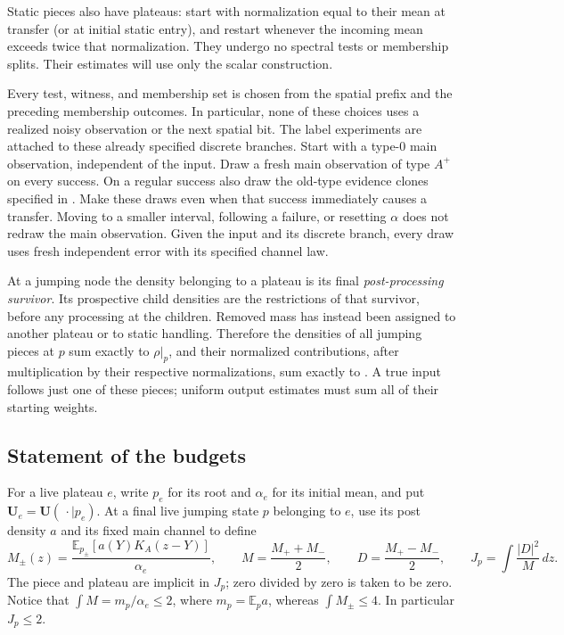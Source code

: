 Static pieces also have plateaus: start with normalization equal to
their mean at transfer (or at initial static entry), and restart
whenever the incoming mean exceeds twice that normalization.  They
undergo no spectral tests or membership splits.  Their estimates will
use only the scalar construction.

Every test, witness, and membership set is chosen from the spatial
prefix and the preceding membership outcomes.  In particular, none of
these choices uses a realized noisy observation or the next spatial
bit.  The label experiments are attached to these already specified
discrete branches.  Start with a type-$0$ main observation, independent
of the input.  Draw a fresh main observation of type $A^+$ on every
success.  On a regular success also draw the old-type evidence clones
specified in .  Make these draws even when
that success immediately causes a transfer.  Moving to a smaller
interval, following a failure, or resetting $\alpha$ does not redraw
the main observation.  Given the input and its discrete branch, every
draw uses fresh independent error with its specified channel law.

At a jumping node the density belonging to a plateau is its final
\emph{post-processing survivor}.  Its prospective child densities
are the restrictions of that survivor, before any processing at the
children.  Removed mass has instead been assigned to another plateau
or to static handling.  Therefore the densities of all jumping pieces
at $p$ sum exactly to $\rho|_p$, and their normalized contributions, after
multiplication by their respective normalizations, sum exactly to
.  A true input follows just one of these pieces;
uniform output estimates must sum all of their starting weights.

\subsection{Statement of the budgets}

For a live plateau $e$, write $p_e$ for its root and $\alpha_e$ for its
initial mean, and put $\mathbf U_e=\mathbf U(\,\cdot\mid p_e)$.
At a final live jumping state $p$ belonging to $e$, use its post
density $a$ and its fixed main channel to define
\[
 M_\pm(z)=\frac{\mathbb E_{p_\pm}[a(Y)K_A(z-Y)]}{\alpha_e},\qquad
 M=\frac{M_++M_-}{2},\qquad
 D=\frac{M_+-M_-}{2},\qquad
 J_p=\int\frac{|D|^2}{M}\,dz.
\]
The piece and plateau are implicit in $J_p$; zero divided by zero is
taken to be zero.  Notice that $\int M=m_p/\alpha_e\le2$, where
$m_p=\mathbb E_p a$, whereas $\int M_\pm\le4$.  In particular
$J_p\le2$.

